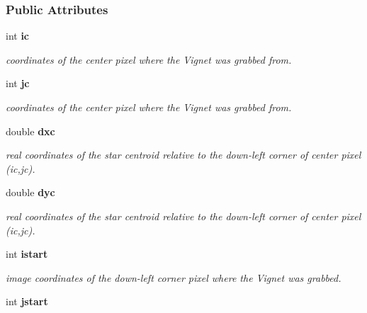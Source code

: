 \subsubsection*{Public Attributes}
\begin{CompactItemize}
\item 
{}
int {\bf ic}\label{class_vignet_m0}

\begin{CompactList}\small\item\em coordinates of the center pixel where the Vignet was grabbed from.\item\end{CompactList}\item 
{}
int {\bf jc}\label{class_vignet_m1}

\begin{CompactList}\small\item\em coordinates of the center pixel where the Vignet was grabbed from.\item\end{CompactList}\item 
{}
double {\bf dxc}\label{class_vignet_m2}

\begin{CompactList}\small\item\em real coordinates of the star centroid relative to the down-left corner of center pixel (ic,jc).\item\end{CompactList}\item 
{}
double {\bf dyc}\label{class_vignet_m3}

\begin{CompactList}\small\item\em real coordinates of the star centroid relative to the down-left corner of center pixel (ic,jc).\item\end{CompactList}\item 
{}
int {\bf istart}\label{class_vignet_m4}

\begin{CompactList}\small\item\em image coordinates of the down-left corner pixel where the Vignet was grabbed.\item\end{CompactList}\item 
{}
int {\bf jstart}\label{class_vignet_m5}


\end{CompactItemize}
